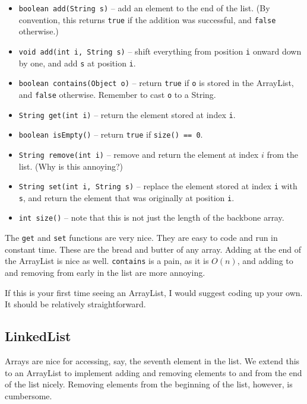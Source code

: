 \documentclass[11pt]{book}
\begin{document}
\begin{itemize}

\item
\texttt{boolean add(String s)} -- add an element to the end of the list. (By convention, this returns \texttt{true} if the addition was successful, and \texttt{false} otherwise.)
\item
\texttt{void add(int i, String s)} -- shift everything from position \texttt{i} onward down by one, and add \texttt{s} at position \texttt{i}.
\item
\texttt{boolean contains(Object o)} -- return \texttt{true} if \texttt{o} is stored in the ArrayList, and \texttt{false} otherwise. Remember to cast \texttt{o} to a String.
\item
\texttt{String get(int i)} -- return the element stored at index \texttt{i}.
\item
\texttt{boolean isEmpty()} -- return \texttt{true} if \texttt{size() == 0}.
\item
\texttt{String remove(int i)} -- remove and return the element at index $i$ from the list. (Why is this annoying?)
\item
\texttt{String set(int i, String s)} -- replace the element stored at index \texttt{i} with \texttt{s}, and return the element that was originally at position \texttt{i}.
\item
\texttt{int size()} -- note that this is not just the length of the backbone array.
\end{itemize}

The \texttt{get} and \texttt{set} functions are very nice. They are easy to code and run in constant time. These are the bread and butter of any array. Adding at the end of the ArrayList is nice as well. \texttt{contains} is a pain, as it is $O(n)$, and adding to and removing from early in the list are more annoying.

If this is your first time seeing an ArrayList, I would suggest coding up your own. It should be relatively straightforward.

\subsection{LinkedList}

Arrays are nice for accessing, say, the seventh element in the list. We extend this to an ArrayList to implement adding and removing elements to and from the end of the list nicely. Removing elements from the beginning of the list, however, is cumbersome.
\end{document}
